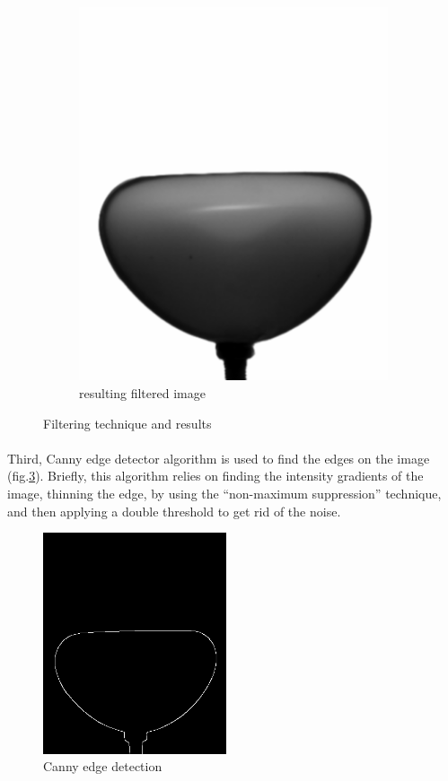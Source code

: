 \begin{figure}[H]
		\begin{subfigure}[h]{0.48\textwidth}%
        \includegraphics[width=\linewidth]{figures/Chapter_1/resulting_f.png}%
        \caption{resulting filtered image}%
				\label{fig:resulting_f}%
    \end{subfigure}%
		\caption{Filtering technique and results}%
		\label{fig:filtering_image_treatment}%
\end{figure}
\paragraph{}
Third, Canny edge detector algorithm\cite{canny} is used to find the edges on the image (fig.\ref{fig:canny}). Briefly, this algorithm relies on finding the intensity gradients of the image, thinning the edge, by using the "`non-maximum suppression"' technique, and then applying a double threshold to get rid of the noise.
\begin{figure}[H] %
	\centering%
  \includegraphics[width=0.48\textwidth]{figures/Chapter_1/canny.png}
	\caption{Canny edge detection}
	\label{fig:canny}
\end{figure}
